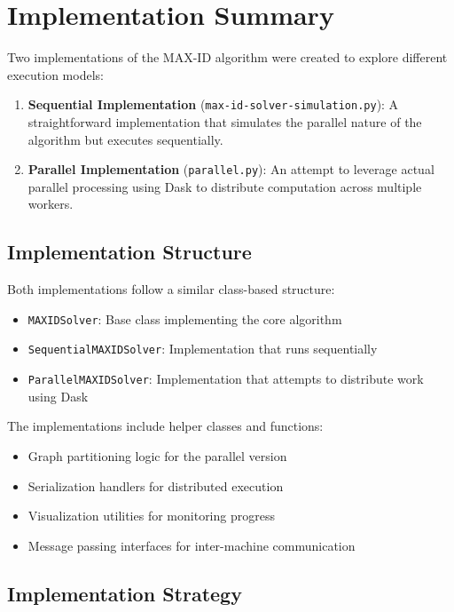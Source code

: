 \documentclass[11pt,a4paper]{article}
\begin{document}
\section{Implementation Summary}

Two implementations of the MAX-ID algorithm were created to explore different execution models:

\begin{enumerate}
    \item \textbf{Sequential Implementation} (\texttt{max-id-solver-simulation.py}): A straightforward implementation that simulates the parallel nature of the algorithm but executes sequentially.
    \item \textbf{Parallel Implementation} (\texttt{parallel.py}): An attempt to leverage actual parallel processing using Dask to distribute computation across multiple workers.
\end{enumerate}

\subsection{Implementation Structure}

Both implementations follow a similar class-based structure:

\begin{itemize}
    \item \texttt{MAXIDSolver}: Base class implementing the core algorithm
    \item \texttt{SequentialMAXIDSolver}: Implementation that runs sequentially
    \item \texttt{ParallelMAXIDSolver}: Implementation that attempts to distribute work using Dask
\end{itemize}

The implementations include helper classes and functions:
\begin{itemize}
    \item Graph partitioning logic for the parallel version
    \item Serialization handlers for distributed execution
    \item Visualization utilities for monitoring progress
    \item Message passing interfaces for inter-machine communication
\end{itemize}

\subsection{Implementation Strategy}
\end{document}
